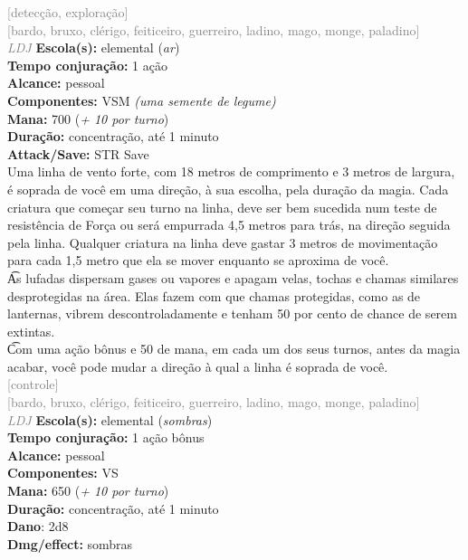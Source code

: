 \documentclass{RPG_Adventure}[2021/10/20]
\begin{document}
{\scriptsize \textcolor{gray}{[detecção, exploração]\\}}
{\scriptsize \textcolor{gray}{[bardo, bruxo, clérigo, feiticeiro, guerreiro, ladino, mago, monge, paladino]\\}}
{\tiny \textcolor{gray}{\textit{LDJ}}}
{\small \t \textbf{Escola(s):} elemental (\textit{ar})\\\t \textbf{Tempo conjuração:} 1 ação\\\t \textbf{Alcance:} pessoal\\\t \textbf{Componentes:} VSM \textit{(uma semente de legume)}\\\t \textbf{Mana:} 700 (\textit{+ 10 por turno})\\\t \textbf{Duração:} concentração, até 1 minuto\\\t \textbf{Attack/Save:} STR Save\\}
{\normalsize Uma linha de vento forte, com 18 metros de comprimento e 3 metros de largura, é soprada de você em uma direção, à sua escolha, pela duração da magia. Cada criatura que começar seu turno na linha, deve ser bem sucedida num teste de resistência de Força ou será empurrada 4,5 metros para trás, na direção seguida pela linha. Qualquer criatura na linha deve gastar 3 metros de movimentação para cada 1,5 metro que ela se mover enquanto se aproxima de você.\\\t As lufadas dispersam gases ou vapores e apagam velas, tochas e chamas similares desprotegidas na área. Elas fazem com que chamas protegidas, como as de lanternas, vibrem descontroladamente e tenham 50 por cento de chance de serem extintas.\\\t Com uma ação bônus e 50 de mana, em cada um dos seus turnos, antes da magia acabar, você pode mudar a direção à qual a linha é soprada de você.\\}
{\scriptsize \textcolor{gray}{[controle]\\}}
{\scriptsize \textcolor{gray}{[bardo, bruxo, clérigo, feiticeiro, guerreiro, ladino, mago, monge, paladino]\\}}
{\tiny \textcolor{gray}{\textit{LDJ}}}
{\small \t \textbf{Escola(s):} elemental (\textit{sombras})\\\t \textbf{Tempo conjuração:} 1 ação bônus\\\t \textbf{Alcance:} pessoal\\\t \textbf{Componentes:} VS\\\t \textbf{Mana:} 650 (\textit{+ 10 por turno})\\\t \textbf{Duração:} concentração, até 1 minuto\\\t \textbf{Dano}: 2d8\\\t \textbf{Dmg/effect:} sombras\\}
\end{document}
